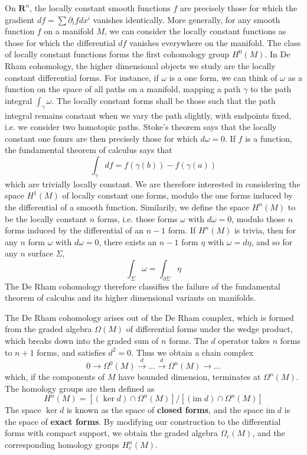 On $\mathbf{R}^n$, the locally constant smooth functions $f$ are precisely those for which the gradient $d f = \sum \partial_i f dx^i$ vanishes identically. More generally, for any smooth function $f$ on a manifold $M$, we can consider the locally constant functions as those for which the differential $df$ vanishes everywhere on the manifold. The class of locally constant functions forms the first cohomology group $H^0(M)$. In De Rham cohomology, the higher dimensional objects we study are the locally constant differential forms. For instance, if $\omega$ is a one form, we can think of $\omega$ as a function on the space of all paths on a manifold, mapping a path $\gamma$ to the path integral $\int_\gamma \omega$. The locally constant forms shall be those such that the path integral remains constant when we vary the path slightly, with endpoints fixed, i.e. we consider two homotopic paths. Stoke's theorem says that the locally constant one fomrs are then precisely those for which $d \omega = 0$. If $f$ is a function, the fundamental theorem of calculus says that
%
\[ \int_\gamma df = f(\gamma(b)) - f(\gamma(a)) \]
%
which are trivially locally constant. We are therefore interested in considering the space $H^1(M)$ of locally constant one forms, modulo the one forms induced by the differential of a smooth function. Similarily, we define the space $H^n(M)$ to be the locally constant $n$ forms, i.e. those forms $\omega$ with $d\omega = 0$, modulo those $n$ forms induced by the differential of an $n-1$ form. If $H^n(M)$ is trivia, then for any $n$ form $\omega$ with $d\omega = 0$, there exists an $n-1$ form $\eta$ with $\omega = d\eta$, and so for any $n$ surface $\Sigma$,
%
\[ \int_\Sigma \omega = \int_{\partial \Sigma} \eta \]
%
The De Rham cohomology therefore classifies the failure of the fundamental theorem of calculus and its higher dimensional variants on manifolds.

The De Rham cohomology arises out of the De Rham complex, which is formed from the graded algebra $\Omega(M)$ of differential forms under the wedge product, which breaks down into the graded sum of $n$ forms. The $d$ operator takes $n$ forms to $n+1$ forms, and satisfies $d^2 = 0$. Thus we obtain a chain complex
%
\[ 0 \to \Omega^0(M) \xrightarrow{d} \dots \xrightarrow{d} \Omega^n(M) \to \dots \]
%
which, if the components of $M$ have bounded dimension, terminates at $\Omega^n(M)$. The homology groups are then defined as
%
\[ H^n(M) = [(\ker d) \cap \Omega^n(M)] / [(\text{im}\; d) \cap \Omega^n(M)] \]
%
The space $\ker d$ is known as the space of {\bf closed forms}, and the space $\text{im}\; d$ is the space of {\bf exact forms}. By modifying our construction to the differential forms with compact support, we obtain the graded algebra $\Omega_c(M)$, and the corresponding homology groups $H_c^n(M)$.


